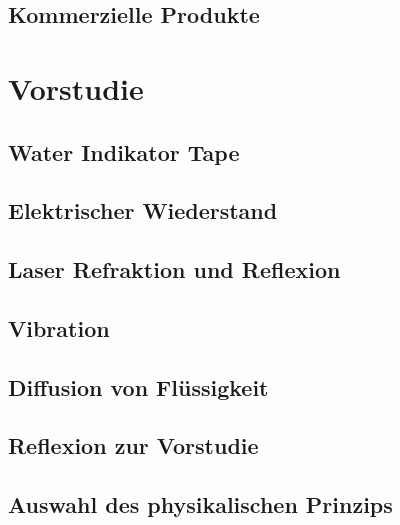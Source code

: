 \documentclass[a4paper,12pt]{article}
\begin{document}
\subsection{Kommerzielle Produkte}




\newpage
\section{Vorstudie}


\subsection{Water Indikator Tape}


\newpage
\subsection{Elektrischer Wiederstand}

\newpage
\subsection{Laser Refraktion und Reflexion}


\subsection{Vibration}

\newpage
\subsection{Diffusion von Flüssigkeit}
\label{sec:TinteVersuchsaufbau}


\subsection{Reflexion zur Vorstudie}


\subsection{Auswahl des physikalischen Prinzips}

\end{document}
